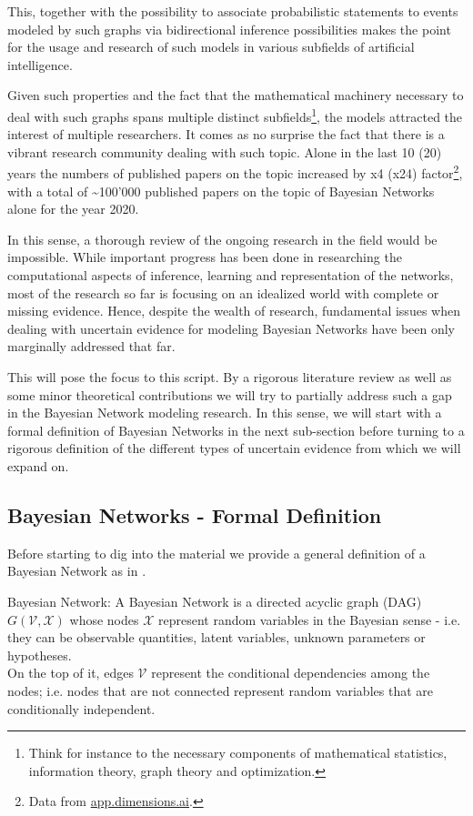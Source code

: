 \documentclass[11pt]{article}
\begin{document}
\begin{article}
This, together with the possibility to associate probabilistic
statements to events modeled by such graphs via bidirectional
inference possibilities makes the point for the usage and research
of such models in various subfields of artificial intelligence.

Given such properties and the fact that the mathematical machinery
necessary to deal with such graphs spans multiple distinct
subfields\footnote{Think for instance to the necessary components of mathematical
statistics, information theory, graph theory and optimization.}, the models attracted the interest of multiple
researchers. It comes as no surprise the fact that there is a
vibrant research community dealing with such topic. Alone in the
last 10 (20) years the numbers of published papers on the topic
increased by x4 (x24) factor\footnote{Data from \href{https://app.dimensions.ai/discover/publication}{app.dimensions.ai}.}, with a total of \textasciitilde{}100'000
published papers on the topic of Bayesian Networks alone for the
year 2020.

In this sense, a thorough review of the ongoing research in the
field would be impossible. While important progress has been done
in researching the computational aspects of inference, learning and
representation of the networks, most of the research so far is
focusing on an idealized world with complete or missing
evidence. Hence, despite the wealth of research, fundamental issues
when dealing with uncertain evidence for modeling Bayesian Networks
have been only marginally addressed that far.

This will pose the focus to this script. By a rigorous literature
review as well as some minor theoretical contributions we will try to
partially address such a gap in the Bayesian Network modeling
research. In this sense, we will start with a formal definition of
Bayesian Networks in the next sub-section before turning to a
rigorous definition of the different types of uncertain evidence
from which we will expand on.

\subsection{Bayesian Networks - Formal Definition}
\label{sec:org31a9a99}
Before starting to dig into the material we provide a general
definition of a Bayesian Network as in \cite{pearl2011bayesian}.

\begin{definition}
Bayesian Network: A Bayesian Network is a directed acyclic graph (DAG) $G(\mathscr{V}, \mathscr{X})$
whose nodes $\mathscr{X}$ represent random variables in the Bayesian sense - i.e. they can be observable
quantities, latent variables, unknown parameters or hypotheses. \\
On the top of it, edges $\mathscr{V}$ represent the conditional dependencies among the nodes; i.e. nodes that
are not connected represent random variables that are conditionally independent.
\end{definition}


\end{article}
\end{document}

